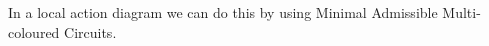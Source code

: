 \documentclass[preview]{standalone}
\begin{document}
In a local action diagram we can do this by using Minimal Admissible Multi-coloured Circuits.\\
\end{document}
